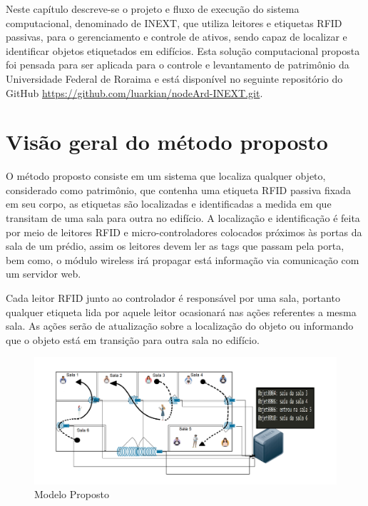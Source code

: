 \label{chapter:metodo}

Neste capítulo descreve-se o projeto e fluxo de execução do sistema computacional, denominado de INEXT, que utiliza leitores e etiquetas RFID passivas, para o gerenciamento e controle de ativos, sendo capaz de localizar e identificar objetos etiquetados em edifícios.
%
%
Esta solução computacional proposta foi pensada para ser aplicada para o controle e levantamento de patrimônio da Universidade Federal de Roraima e está disponível no seguinte repositório do GitHub \url{https://github.com/luarkian/nodeArd-INEXT.git}.

%
%
\section{Visão geral do método proposto}

O método proposto consiste em um sistema que localiza qualquer objeto, considerado como patrimônio, que contenha uma etiqueta RFID passiva fixada em seu corpo, as etiquetas são localizadas e identificadas a medida em que transitam de uma sala para outra no edifício.
%
A localização e identificação é feita por meio de leitores RFID e micro-controladores colocados próximos às portas da sala
de um prédio, assim os leitores devem ler as tags que passam pela porta, bem como, o módulo wireless irá propagar está informação via
comunicação com um servidor web. 


Cada leitor RFID junto ao controlador é responsável por uma sala, portanto qualquer etiqueta lida por aquele leitor
ocasionará nas ações referentes a mesma sala. As ações serão de atualização sobre a localização do objeto ou informando
que o objeto está em transição para outra sala no edifício.
\begin{figure}[H]
              \caption{\label{fig:modelo}{Modelo Proposto}}
              \centering
              \includegraphics[width=1.1\textwidth]{Figuras/bigpicture.png}
        \end{figure}


